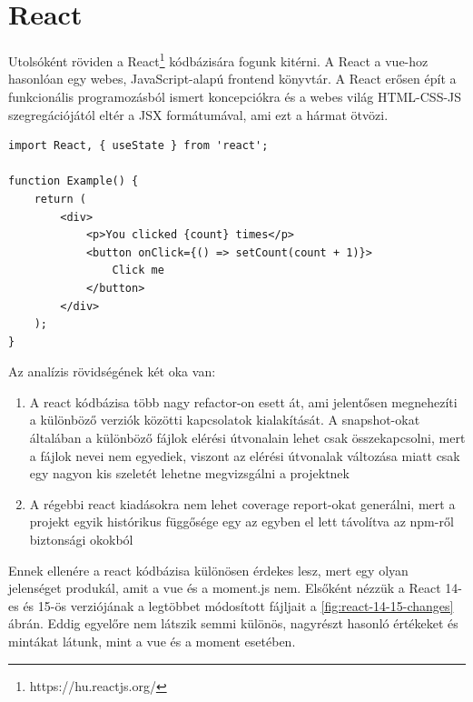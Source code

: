 \section{React}

Utolsóként röviden a React\footnote{https://hu.reactjs.org/} kódbázisára fogunk kitérni. A React a vue-hoz hasonlóan egy webes, JavaScript-alapú frontend könyvtár. A React erősen épít a funkcionális programozásból ismert koncepciókra és a webes világ HTML-CSS-JS szegregációjától eltér a JSX formátumával, ami ezt a hármat ötvözi.

\begin{lstlisting}
import React, { useState } from 'react';

function Example() {
    return (
        <div>
            <p>You clicked {count} times</p>
            <button onClick={() => setCount(count + 1)}>
                Click me
            </button>
        </div>
    );
}
\end{lstlisting}

Az analízis rövidségének két oka van:
\begin{enumerate}
    \item A react kódbázisa több nagy refactor-on esett át, ami jelentősen megnehezíti a különböző verziók közötti kapcsolatok kialakítását. A snapshot-okat általában a különböző fájlok elérési útvonalain lehet csak összekapcsolni, mert a fájlok nevei nem egyediek, viszont az elérési útvonalak változása miatt csak egy nagyon kis szeletét lehetne megvizsgálni a projektnek
    \item A régebbi react kiadásokra nem lehet coverage report-okat generálni, mert a projekt egyik histórikus függősége egy az egyben el lett távolítva az npm-ről biztonsági okokból
\end{enumerate}

Ennek ellenére a react kódbázisa különösen érdekes lesz, mert egy olyan jelenséget produkál, amit a vue és a moment.js nem.
Elsőként nézzük a React 14-es és 15-ös verziójának a legtöbbet módosított fájljait a \ref{fig:react-14-15-changes} ábrán. Eddig egyelőre nem látszik semmi különös, nagyrészt hasonló értékeket és mintákat látunk, mint a vue és a moment esetében.

